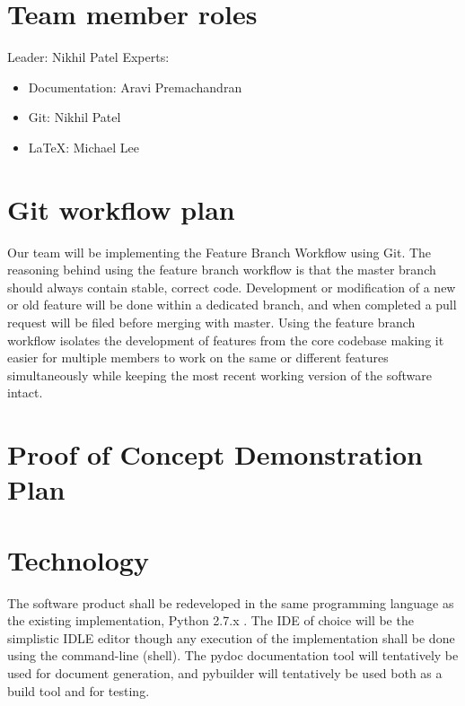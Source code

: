\documentclass{article}
\begin{document}
\section{Team member roles}

\noindent Leader: Nikhil Patel \newline
\noindent Experts:
\vspace{-2mm}
\begin{itemize}
	\itemsep0em
	\item Documentation: Aravi Premachandran
	\item Git: Nikhil Patel
	\item LaTeX: Michael Lee
\end{itemize}

\section{Git workflow plan} 

\noindent Our team will be implementing the Feature Branch Workflow using Git.
The reasoning behind using the feature branch workflow is that the master branch
should always contain stable, correct code. Development or modification of a new
or old feature will be done within a dedicated branch, and when completed a pull
request will be filed before merging with master. Using the feature branch
workflow isolates the development of features from the core codebase making it
easier for multiple members to work on the same or different features
simultaneously while keeping the most recent working version of the software
intact.


\section{Proof of Concept Demonstration Plan}

\noindent 

\section{Technology} 
\noindent The software product shall be redeveloped in the
same programming language as the existing implementation, Python 2.7.x . The IDE
of choice will be the simplistic IDLE editor though any execution of the
implementation shall be done using the command-line (shell). The pydoc
documentation tool will tentatively be used for document generation, and
pybuilder will tentatively be used both as a build tool and for testing.
\end{document}
